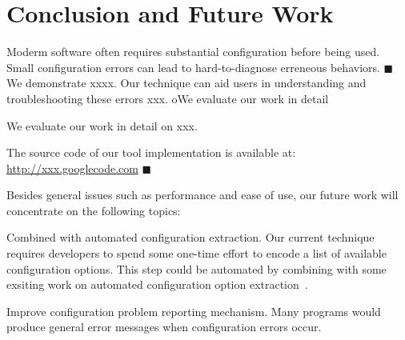 \section{Conclusion and Future Work}



Moderm software often requires substantial configuration
before being used. Small configuration errors can lead to
hard-to-diagnose erreneous behaviors.
$\blacksquare$ We demonstrate xxxx.
Our technique can aid users in understanding and
troubleshooting these errors xxx.
oWe evaluate our work in detail

We evaluate our work in detail on xxx.

The source code of our tool implementation is available at:
\url{http://xxx.googlecode.com} $\blacksquare$

\vspace{1mm}

Besides general issues such as performance and ease of use, our future
work will concentrate on the following topics:

Combined with automated configuration extraction. Our current
technique requires developers to spend some one-time effort
to encode a list of available configuration options. This step
could be automated by combining with some exsiting work on
automated configuration option extraction~\cite{}.

Improve configuration problem reporting mechanism. Many
programs would produce general error messages when configuration
errors occur.
